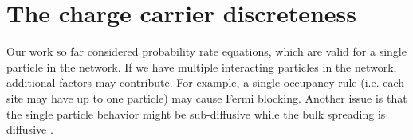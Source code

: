 \section{The charge carrier discreteness}\label{sec:discreteness}

Our work so far considered probability rate equations, which are valid for a single particle in the network.
If we have multiple interacting particles in the network, additional factors may contribute. For example,
a single occupancy rule (i.e. each site may have up to one particle) may cause Fermi blocking. Another
issue is that the single particle behavior might be sub-diffusive while the bulk spreading is diffusive \cite{richards_theory_1977,hung_diffusion_2011}.










